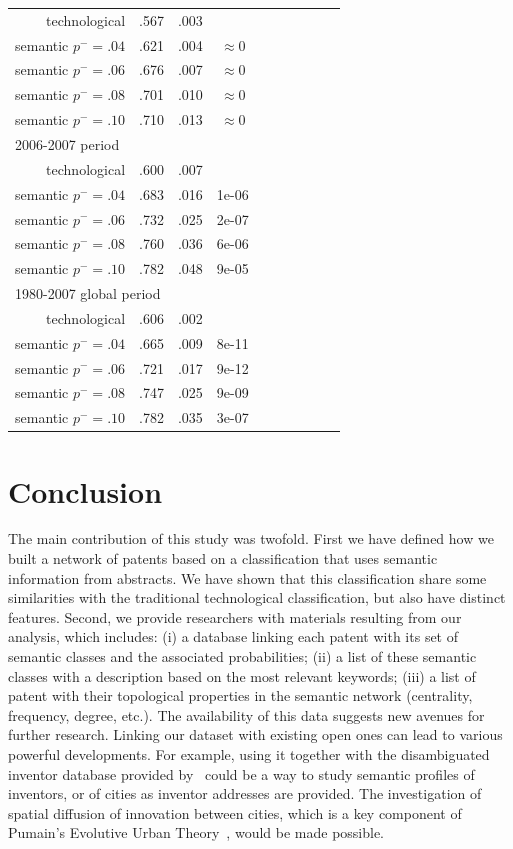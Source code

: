 \documentclass[article]{article}%
\begin{document}
\begin{table}[!ht]
\begin{tabular}{@{}rccccccccc@{}}
technological & .567 &.003&\\
semantic $p^{-} = .04$ & .621 &.004 & $\approx 0$\\
semantic $p^{-} = .06$ & .676 &.007 & $\approx 0$\\
semantic $p^{-} = .08$ & .701 &.010 & $\approx 0$\\
semantic $p^{-} = .10$ & .710 &.013 & $\approx 0$\\
\multicolumn{4}{l}{2006-2007 period} \\
technological & .600 &.007&\\
semantic $p^{-} = .04$ & .683 &.016 & 1e-06\\
semantic $p^{-} = .06$ & .732 &.025 & 2e-07\\
semantic $p^{-} = .08$ & .760 &.036 & 6e-06\\
semantic $p^{-} = .10$ & .782 &.048 &9e-05\\
\multicolumn{4}{l}{1980-2007 global period} \\
technological & .606 &.002&\\
semantic $p^{-} = .04$ & .665 &.009 & 8e-11\\
semantic $p^{-} = .06$ & .721 &.017 & 9e-12\\
semantic $p^{-} = .08$ & .747 &.025 & 9e-09\\
semantic $p^{-} = .10$ & .782 &.035 & 3e-07\\
\bottomrule
\end{tabular}
\end{table}



\section{Conclusion \label{discussion}}

The main contribution of this study was twofold. First we have defined how we built a network of patents based on a classification that uses semantic information from abstracts. We have shown that this classification share some similarities with the traditional technological classification, but also have distinct features. Second, we provide researchers with materials resulting from our analysis, which includes: (i) a database linking each patent with its set of semantic classes and the associated probabilities; (ii) a list of these semantic classes with a description based on the most relevant keywords; (iii) a list of patent with their topological properties in the semantic network (centrality, frequency, degree, etc.). The availability of this data suggests new avenues for further research. Linking our dataset with existing open ones can lead to various powerful developments. For example, using it together with the disambiguated inventor database provided by~\cite{li2014disambiguation} could be a way to study semantic profiles of inventors, or of cities as inventor addresses are provided. The investigation of spatial diffusion of innovation between cities, which is a key component of Pumain's Evolutive Urban Theory~\cite{pumain2010theorie}, would be made possible.
\end{document}
